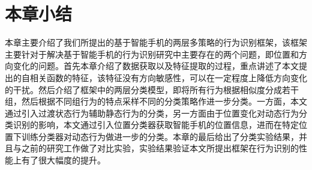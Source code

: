  \section{本章小结}
 \par 本章主要介绍了我们所提出的基于智能手机的两层多策略的行为识别框架，该框架主要针对于解决基于智能手机的行为识别研究中主要存在的两个问题，即位置和方向变化的问题。首先本章介绍了数据获取以及特征提取的过程，重点讲述了本文提出的自相关函数的特征，该特征没有方向敏感性，可以在一定程度上降低方向变化的干扰。然后介绍了框架中的两层分类模型，即将所有行为根据相似度分成若干组，然后根据不同组行为的特点采样不同的分类策略作进一步分类。一方面，本文通过引入过渡状态行为辅助静态行为的分类，另一方面由于位置变化对动态行为分类识别的影响，本文通过引入位置分类器获取智能手机的位置信息，进而在特定位置下训练分类器对动态行为做进一步的分类。本章的最后给出了分类实验结果，并且与之前的研究工作做了对比实验，实验结果验证本文所提出框架在行为识别的性能上有了很大幅度的提升。
